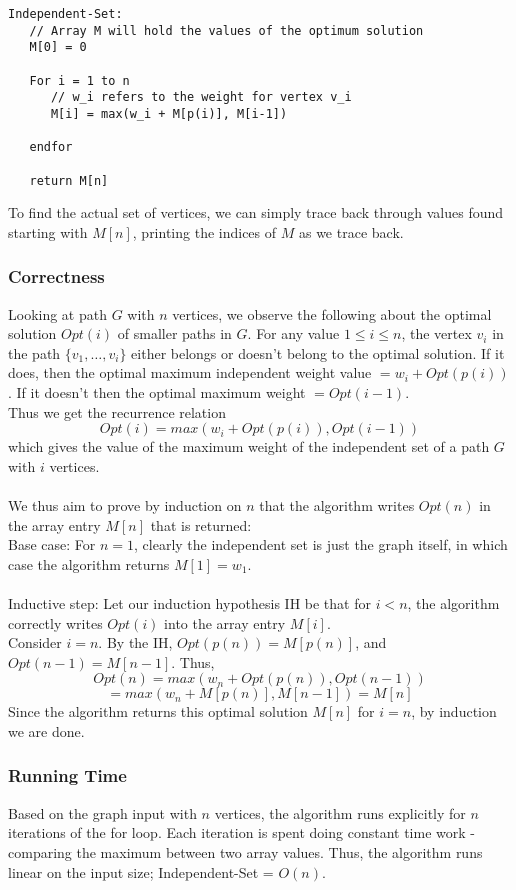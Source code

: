 \documentclass[12pt, oneside]{article}
\begin{document}
\begin{verbatim}
Independent-Set:
   // Array M will hold the values of the optimum solution 
   M[0] = 0
   
   For i = 1 to n
      // w_i refers to the weight for vertex v_i
      M[i] = max(w_i + M[p(i)], M[i-1])
   
   endfor
   
   return M[n]
\end{verbatim}

To find the actual set of vertices, we can simply trace back through values found starting with $M[n]$, printing the indices of $M$ as we trace back.

\subsubsection*{Correctness}
Looking at path $G$ with $n$ vertices, we observe the following about the optimal solution $Opt(i)$ of smaller paths in $G$. For any value $1 \leq i \leq n$, the vertex $v_i$ in the path $\{v_1,\dots,v_i\}$ either belongs or doesn't belong to the optimal solution. If it does, then the optimal maximum independent weight value $= w_i + Opt(p(i))$. If it doesn't then the optimal maximum weight $= Opt(i-1)$.\\
Thus we get the recurrence relation
\[Opt(i) = max(w_i + Opt(p(i)), Opt(i-1))\]
which gives the value of the maximum weight of the independent set of a path $G$ with $i$ vertices.\\\\
We thus aim to prove by induction on $n$ that the algorithm writes $Opt(n)$ in the array entry $M[n]$ that is returned:\\
Base case: For $n=1$, clearly the independent set is just the graph itself, in which case the algorithm returns $M[1] = w_1$.\\\\
Inductive step: Let our induction hypothesis IH be that for $i < n$, the algorithm correctly writes $Opt(i)$ into the array entry $M[i]$.\\
Consider $i = n$. By the IH, $Opt(p(n)) = M[p(n)]$, and $Opt(n-1) = M[n-1]$. Thus,
\[Opt(n) = max(w_n + Opt(p(n)), Opt(n-1))\]
\[= max(w_n + M[p(n)],M[n-1]) = M[n]\]
Since the algorithm returns this optimal solution $M[n]$ for $i=n$, by induction we are done.

\subsubsection*{Running Time}
Based on the graph input with $n$ vertices, the algorithm runs explicitly for $n$ iterations of the for loop. Each iteration is spent doing constant time work - comparing the maximum between two array values. Thus, the algorithm runs linear on the input size; Independent-Set = $O(n)$.\\
\end{document}

